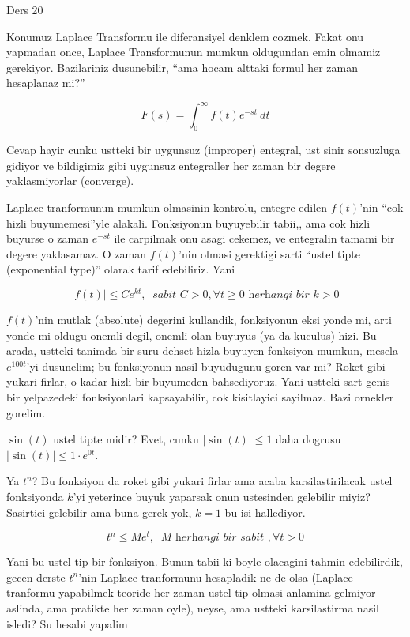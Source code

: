 \documentclass[12pt,fleqn]{article}\usepackage{../common}
\begin{document}
Ders 20

Konumuz Laplace Transformu ile diferansiyel denklem cozmek. Fakat onu
yapmadan once, Laplace Transformunun mumkun oldugundan emin olmamiz
gerekiyor. Bazilariniz dusunebilir, ``ama hocam alttaki formul her zaman
hesaplanaz mi?''

\[ F(s) = \int_0^{\infty} f(t)e^{-st} \ dt \]

Cevap hayir cunku ustteki bir uygunsuz (improper) entegral, ust sinir
sonsuzluga gidiyor ve bildigimiz gibi uygunsuz entegraller her zaman bir
degere yaklasmiyorlar (converge). 

Laplace tranformunun mumkun olmasinin kontrolu, entegre edilen $f(t)$'nin
``cok hizli buyumemesi''yle alakali. Fonksiyonun buyuyebilir tabii,, ama
cok hizli buyurse o zaman $e^{-st}$ ile carpilmak onu asagi cekemez, ve
entegralin tamami bir degere yaklasamaz. O zaman $f(t)$'nin olmasi
gerektigi sarti ``ustel tipte (exponential type)'' olarak tarif
edebiliriz. Yani 

\[ |f(t)| \le C e^{kt}, \ \textit{ sabit } C > 0, \forall t \ge 0 
\textit{ herhangi bir } k > 0
\]

$f(t)$'nin mutlak (absolute) degerini kullandik, fonksiyonun eksi yonde mi,
arti yonde mi oldugu onemli degil, onemli olan buyuyus (ya da kuculus)
hizi. Bu arada, ustteki tanimda bir suru dehset hizla buyuyen fonksiyon
mumkun, mesela $e^{100t}$'yi dusunelim; bu fonksiyonun nasil buyudugunu
goren var mi? Roket gibi yukari firlar, o kadar hizli bir buyumeden
bahsediyoruz. Yani ustteki sart genis bir yelpazedeki fonksiyonlari
kapsayabilir, cok kisitlayici sayilmaz. Bazi ornekler gorelim.

$\sin(t)$ ustel tipte midir? Evet, cunku $|\sin(t)| \le 1$ daha dogrusu
$|\sin(t)| \le 1 \cdot e^{0t}$. 

Ya $t^n$? Bu fonksiyon da roket gibi yukari firlar ama acaba
karsilastirilacak ustel fonksiyonda $k$'yi yeterince buyuk yaparsak onun
ustesinden gelebilir miyiz? Sasirtici gelebilir ama buna gerek yok, $k=1$
bu isi hallediyor. 

\[ t^n \le M e^t, \ \textit{ M herhangi bir sabit }, \forall t > 0 \]

Yani bu ustel tip bir fonksiyon. Bunun tabii ki boyle olacagini tahmin
edebilirdik, gecen derste $t^n$'nin Laplace tranformunu hesapladik ne de
olsa (Laplace tranformu yapabilmek teoride her zaman ustel tip olmasi
anlamina gelmiyor aslinda, ama pratikte her zaman oyle), neyse, ama ustteki
karsilastirma nasil isledi? Su hesabi yapalim
\end{document}
